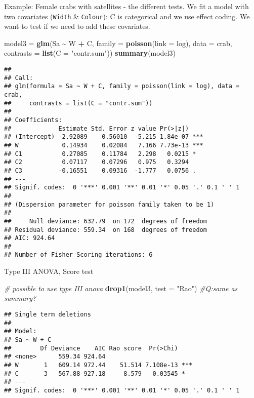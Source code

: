 \documentclass[
  ignorenonframetext,
]{beamer}
\newenvironment{Shaded}{\begin{snugshade}}{\end{snugshade}}
\newcommand{\AttributeTok}[1]{\textcolor[rgb]{0.13,0.29,0.53}{#1}}
\newcommand{\CommentTok}[1]{\textcolor[rgb]{0.56,0.35,0.01}{\textit{#1}}}
\newcommand{\FunctionTok}[1]{\textcolor[rgb]{0.13,0.29,0.53}{\textbf{#1}}}
\newcommand{\NormalTok}[1]{#1}
\newcommand{\OtherTok}[1]{\textcolor[rgb]{0.56,0.35,0.01}{#1}}
\newcommand{\SpecialCharTok}[1]{\textcolor[rgb]{0.81,0.36,0.00}{\textbf{#1}}}
\newcommand{\StringTok}[1]{\textcolor[rgb]{0.31,0.60,0.02}{#1}}
\begin{document}
\begin{frame}[fragile]
\begin{block}{Example: Female crabs with satellites - the different
tests.}
\label{example-female-crabs-with-satellites---the-different-tests.}
We fit a model with two covariates (\texttt{Width} \& \texttt{Colour}):
C is categorical and we use effect coding. We want to test if we need to
add these covariates.

\begin{Shaded}
\begin{Highlighting}[]
\NormalTok{model3 }\OtherTok{=} \FunctionTok{glm}\NormalTok{(Sa }\SpecialCharTok{\textasciitilde{}}\NormalTok{ W }\SpecialCharTok{+}\NormalTok{ C, }\AttributeTok{family =} \FunctionTok{poisson}\NormalTok{(}\AttributeTok{link =}\NormalTok{ log), }\AttributeTok{data =}\NormalTok{ crab, }\AttributeTok{contrasts =} \FunctionTok{list}\NormalTok{(}\AttributeTok{C =} \StringTok{"contr.sum"}\NormalTok{))}
\FunctionTok{summary}\NormalTok{(model3)}
\end{Highlighting}
\end{Shaded}

\begin{verbatim}
## 
## Call:
## glm(formula = Sa ~ W + C, family = poisson(link = log), data = crab, 
##     contrasts = list(C = "contr.sum"))
## 
## Coefficients:
##             Estimate Std. Error z value Pr(>|z|)    
## (Intercept) -2.92089    0.56010  -5.215 1.84e-07 ***
## W            0.14934    0.02084   7.166 7.73e-13 ***
## C1           0.27085    0.11784   2.298   0.0215 *  
## C2           0.07117    0.07296   0.975   0.3294    
## C3          -0.16551    0.09316  -1.777   0.0756 .  
## ---
## Signif. codes:  0 '***' 0.001 '**' 0.01 '*' 0.05 '.' 0.1 ' ' 1
## 
## (Dispersion parameter for poisson family taken to be 1)
## 
##     Null deviance: 632.79  on 172  degrees of freedom
## Residual deviance: 559.34  on 168  degrees of freedom
## AIC: 924.64
## 
## Number of Fisher Scoring iterations: 6
\end{verbatim}
\end{block}
\end{frame}

\begin{frame}[fragile]{Type III ANOVA, Score test}
\label{type-iii-anova-score-test}
\begin{Shaded}
\begin{Highlighting}[]
\CommentTok{\# possible to use type III anova}
\FunctionTok{drop1}\NormalTok{(model3, }\AttributeTok{test =} \StringTok{"Rao"}\NormalTok{)  }\CommentTok{\#Q:same as summary?}
\end{Highlighting}
\end{Shaded}

\begin{verbatim}
## Single term deletions
## 
## Model:
## Sa ~ W + C
##        Df Deviance    AIC Rao score  Pr(>Chi)    
## <none>      559.34 924.64                        
## W       1   609.14 972.44    51.514 7.108e-13 ***
## C       3   567.88 927.18     8.579   0.03545 *  
## ---
## Signif. codes:  0 '***' 0.001 '**' 0.01 '*' 0.05 '.' 0.1 ' ' 1
\end{verbatim}
\end{frame}
\end{document}
